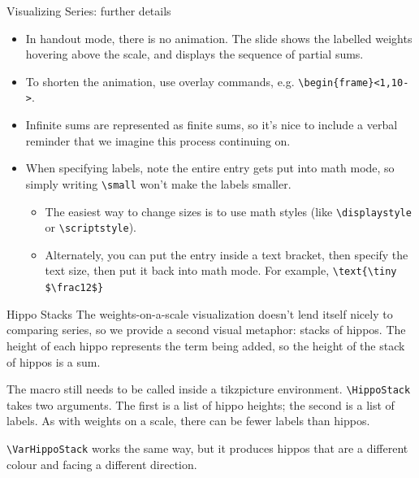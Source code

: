 \documentclass[10pt]{beamer}
\begin{document}
\begin{frame}[fragile]{Visualizing Series: further details}
\begin{itemize}
\item In handout mode, there is no animation. The slide shows the labelled weights hovering above the scale, and displays the sequence of partial sums.
\item To shorten the animation, use overlay commands, e.g. \verb|\begin{frame}<1,10->|.
\item Infinite sums are represented as finite sums, so it's nice to include a verbal reminder that we imagine this process continuing on.
\item When specifying labels,  note the entire entry gets put into math mode, so simply writing \verb|\small| won't make the labels smaller. 
\begin{itemize}
\item The easiest way to change sizes is to use math styles (like \texttt{\textbackslash displaystyle} or \texttt{\textbackslash scriptstyle}). 
\item Alternately, you can put the entry inside a text bracket, then specify the text size, then put it back into math mode. For example, \texttt{\textbackslash text\{\textbackslash tiny \$\textbackslash frac12\$\}}
\end{itemize}
\end{itemize}
\end{frame}
\begin{frame}{Hippo Stacks}
The weights-on-a-scale visualization doesn't lend itself nicely to comparing series, so we provide a second visual metaphor: stacks of hippos. The height of each hippo represents the term being added, so the height of the stack of hippos is a sum. 
\vfill

The macro still needs to be called inside a tikzpicture environment. \texttt{\textbackslash HippoStack} takes two arguments. The first is a list of hippo heights; the second is a list of labels. As with weights on a scale, there can be fewer labels than hippos.
\vfill

\texttt{\textbackslash VarHippoStack} works the same way, but it produces hippos that are a different colour and facing a different direction.
\end{frame}
\end{document}
